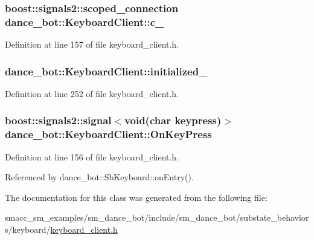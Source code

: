 \subsubsection[{\texorpdfstring{c\+\_\+}{c_}}]{\setlength{\rightskip}{0pt plus 5cm}boost\+::signals2\+::scoped\+\_\+connection dance\+\_\+bot\+::\+Keyboard\+Client\+::c\+\_\+}\hypertarget{classdance__bot_1_1KeyboardClient_ad2318d9d1107915d721f9457c10f1ee6}{}\label{classdance__bot_1_1KeyboardClient_ad2318d9d1107915d721f9457c10f1ee6}


Definition at line 157 of file keyboard\+\_\+client.\+h.

\subsubsection[{\texorpdfstring{initialized\+\_\+}{initialized_}}]{ dance\+\_\+bot\+::\+Keyboard\+Client\+::initialized\+\_\+\hspace{0.3cm}{\ttfamily [private]}}\hypertarget{classdance__bot_1_1KeyboardClient_afb6a3cb23ba0c0e0b65ae7dfad216f19}{}\label{classdance__bot_1_1KeyboardClient_afb6a3cb23ba0c0e0b65ae7dfad216f19}


Definition at line 252 of file keyboard\+\_\+client.\+h.

\subsubsection[{\texorpdfstring{On\+Key\+Press}{OnKeyPress}}]{\setlength{\rightskip}{0pt plus 5cm}boost\+::signals2\+::signal$<$void(char keypress)$>$ dance\+\_\+bot\+::\+Keyboard\+Client\+::\+On\+Key\+Press}\hypertarget{classdance__bot_1_1KeyboardClient_a96fc4ee6a96424305a43d3d23fe66695}{}\label{classdance__bot_1_1KeyboardClient_a96fc4ee6a96424305a43d3d23fe66695}


Definition at line 156 of file keyboard\+\_\+client.\+h.



Referenced by dance\+\_\+bot\+::\+Sb\+Keyboard\+::on\+Entry().



The documentation for this class was generated from the following file\+:\begin{DoxyCompactItemize}
\item 
smacc\+\_\+sm\+\_\+examples/sm\+\_\+dance\+\_\+bot/include/sm\+\_\+dance\+\_\+bot/substate\+\_\+behaviors/keyboard/\hyperlink{keyboard__client_8h}{keyboard\+\_\+client.\+h}\end{DoxyCompactItemize}
